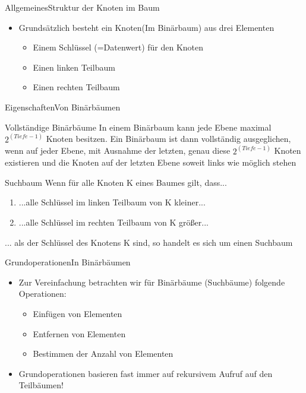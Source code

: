 \begin{frame}{Allgemeines}{Struktur der Knoten im Baum}
	\begin{itemize}
		\item Grundsätzlich besteht ein Knoten(Im Binärbaum) aus drei Elementen
		\begin{itemize}
			\item Einem Schlüssel (=Datenwert) für den Knoten
			\item Einen linken Teilbaum
			\item Einen rechten Teilbaum
		\end{itemize}
	\end{itemize}
\end{frame}

\begin{frame}{Eigenschaften}{Von Binärbäumen}
	\begin{alertblock}{Vollständige Binärbäume}
	In einem Binärbaum kann jede Ebene maximal $2^{(Tiefe-1)}$ Knoten besitzen. Ein Binärbaum ist dann vollständig ausgeglichen, wenn auf jeder Ebene, mit Ausnahme der letzten, genau diese
	$2^{(Tiefe-1)}$ Knoten existieren und die Knoten auf der letzten Ebene soweit links wie möglich stehen
	\end{alertblock}
	
	\begin{alertblock}{Suchbaum}
	Wenn für alle Knoten K eines Baumes gilt, dass...
	\begin{enumerate}
		\item ...alle Schlüssel im linken Teilbaum von K kleiner...
		\item ...alle Schlüssel im rechten Teilbaum von K größer...
	\end{enumerate}
	... als der Schlüssel des Knotens K sind, so handelt es sich um einen Suchbaum
	\end{alertblock}
\end{frame}

\begin{frame}{Grundoperationen}{In Binärbäumen}
	\begin{itemize}
		\item Zur Vereinfachung betrachten wir für Binärbäume (Suchbäume) folgende Operationen:
		\begin{itemize}
			\item Einfügen von Elementen
			\item Entfernen von Elementen
			\item Bestimmen der Anzahl von Elementen
		\end{itemize}
		\item Grundoperationen basieren fast immer auf rekursivem Aufruf auf den Teilbäumen!
	\end{itemize}
\end{frame}

